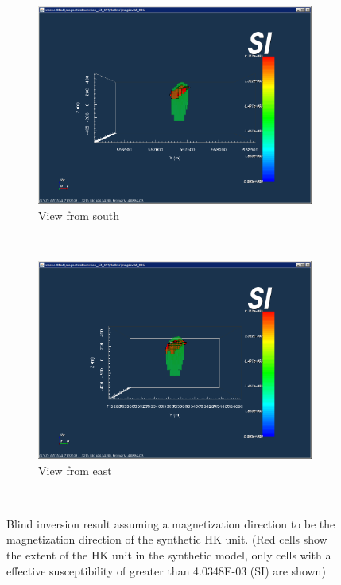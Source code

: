 \begin{figure}
    \centering
    \begin{subfigure}[b]{0.8\textwidth}
        \includegraphics[width=\textwidth]{images/TKC/blind53_19South.PNG}
        \caption{View from south}
        \label{fig:blind53_19South}
    \end{subfigure}
    ~ %
    \begin{subfigure}[b]{0.8\textwidth}
        \includegraphics[width=\textwidth]{images/TKC/blind53_19East.PNG}
        \caption{View from east}
        \label{fig:blind53_19East}
    \end{subfigure}
    ~ %
   \caption{Blind inversion result assuming a magnetization direction to be the magnetization direction of the synthetic HK unit. (Red cells show the extent of the HK unit in the synthetic model, only cells with a effective susceptibility of greater than 4.0348E-03 (SI) are shown)}
   \label{fig:blind53_19}
\end{figure}

